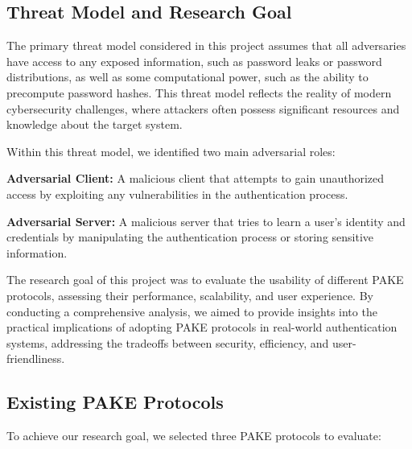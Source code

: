 \subsection{Threat Model and Research Goal}
\label{sec:threatmodel}

The primary threat model considered in this project assumes that all adversaries have access to any exposed information, such as password leaks or password distributions, as well as some computational power, such as the ability to precompute password hashes. This threat model reflects the reality of modern cybersecurity challenges, where attackers often possess significant resources and knowledge about the target system.

Within this threat model, we identified two main adversarial roles:

\begin{newitemize}
    \item \textbf{Adversarial Client:} A malicious client that attempts to gain unauthorized access by exploiting any vulnerabilities in the authentication process.
    \item \textbf{Adversarial Server:} A malicious server that tries to learn a user's identity and credentials by manipulating the authentication process or storing sensitive information.
\end{newitemize}

The research goal of this project was to evaluate the usability of different PAKE protocols, assessing their performance, scalability, and user experience. By conducting a comprehensive analysis, we aimed to provide insights into the practical implications of adopting PAKE protocols in real-world authentication systems, addressing the tradeoffs between security, efficiency, and user-friendliness.

\subsection{Existing PAKE Protocols}
\label{sec:existpake}

To achieve our research goal, we selected three PAKE protocols to evaluate:

